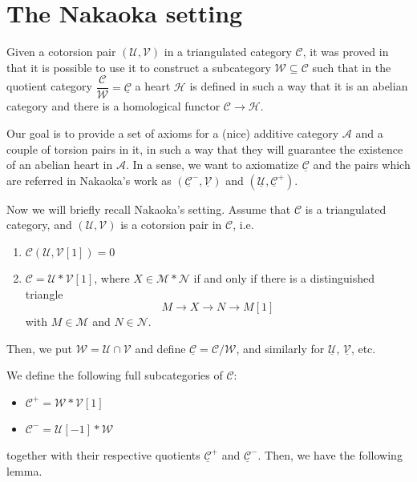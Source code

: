\section{The Nakaoka setting}

Given a cotorsion pair $(\mathcal{U},\mathcal{V})$ in a triangulated category $\mathcal{C}$,
it was proved in \cite{nakaoka2011general} that it is possible to use it to
construct a subcategory $\mathcal{W}\subseteq\mathcal{C}$ such that in the quotient category
$\dfrac{\mathcal{C}}{\mathcal{W}}=\underline{\mathcal{C}}$ a heart $\mathcal{H}$ is defined
in such a way that it is an abelian category and there is a homological functor $\mathcal{C}\to \mathcal{H}$.

Our goal is to provide a set of axioms for a (nice) additive category $\mathcal{A}$
and a couple of torsion pairs in it, in such a way that they will guarantee the existence
of an abelian heart in $\mathcal{A}$. In a sense, we want to axiomatize $\underline{\mathcal{C}}$ and
the pairs which are referred in Nakaoka's work as $(\underline{\mathcal{C}}^-,\underline{\mathcal{V}})$ and
$(\underline{\mathcal{U}},\underline{\mathcal{C}}^+)$.

Now we will briefly recall Nakaoka's setting. Assume that $\mathcal{C}$ is a triangulated category,
and $(\mathcal{U},\mathcal{V})$ is a cotorsion pair in $\mathcal{C}$, i.e.
\begin{enumerate}
  \item $\mathcal{C}(\mathcal{U},\mathcal{V}[1])=0$
  \item $\mathcal{C}=\mathcal{U}\ast \mathcal{V}[1]$, where $X\in \mathcal{M}\ast\mathcal{N}$ if and only if there
  is a distinguished triangle
  \begin{equation*}
    M\to X\to N \to M[1]
  \end{equation*}
  with $M\in \mathcal{M}$ and $N\in\mathcal{N}$.
\end{enumerate}

Then, we put $\mathcal{W}=\mathcal{U}\cap\mathcal{V}$ and define $\underline{\mathcal{C}}=\mathcal{C}/\mathcal{W}$,
and similarly for $\underline{\mathcal{U}}$, $\underline{\mathcal{V}}$, etc.

We define the following full subcategories of $\mathcal{C}$:
\begin{itemize}
  \item $\mathcal{C}^+ = \mathcal{W}\ast\mathcal{V}[1]$
  \item $\mathcal{C}^- = \mathcal{U}[-1]\ast\mathcal{W}$
\end{itemize}
together with their respective quotients $\underline{\mathcal{C}}^+$ and $\underline{\mathcal{C}}^-$.
Then, we have the following lemma.

